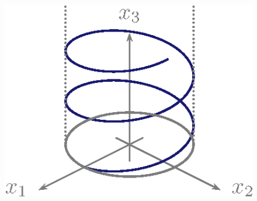 \documentclass[a4paper,10pt]{scrbook}
\begin{document}

\begin{figure}[H]
  \centering
  \includegraphics[scale=0.2]{images/ana3-tmp-44}
\end{figure}
\end{document}
